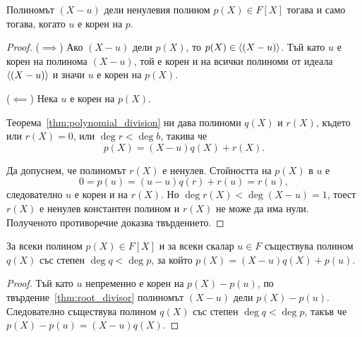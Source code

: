 \documentclass[numbers=endperiod, bibliography=totocnumbered]{scrartcl}
\begin{document}
\begin{proposition}\label{thm:root_divisor}
  Полиномът \( (X - u) \) дели ненулевия полином \( p(X) \in F[X] \) тогава и само тогава, когато \( u \) е корен на \( p \).
\end{proposition}
\begin{proof}
  (\( \implies \)) Ако \( (X - u) \) дели \( p(X) \), то \( p(X) \in \left\langle (X - u) \right\rangle \). Тъй като \( u \) е корен на полинома \( (X - u) \), той е корен и на всички полиноми от идеала \( \left\langle (X - u) \right\rangle \) и значи \( u \) е корен на \( p(X) \).

  (\( \impliedby \)) Нека \( u \) е корен на \( p(X) \).

  Теорема~\ref{thm:polynomial_division} ни дава полиноми \( q(X) \) и \( r(X) \), където или \( r(X) = 0 \), или \( \deg r < \deg b \), такива че
  \begin{equation*}
    p(X) = (X - u) q(X) + r(X).
  \end{equation*}

  Да допуснем, че полиномът \( r(X) \) е ненулев. Стойността на \( p(X) \) в \( u \) е
  \begin{equation*}
    0 = p(u) = (u - u) q(r) + r(u) = r(u),
  \end{equation*}
  следователно \( u \) е корен и на \( r(X) \). Но \( \deg r(X) < \deg (X - u) = 1 \), тоест \( r(X) \) е ненулев константен полином и \( r(X) \) не може да има нули. Полученото противоречие доказва твърдението.
\end{proof}

\begin{proposition}\label{thm:root_inexact_divisor}
  За всеки полином \( p(X) \in F[X] \) и за всеки скалар \( u \in F \) съществува полином \( q(X) \) със степен \( \deg q < \deg p \), за който \( p(X) = (X - u) q(X) + p(u) \).
\end{proposition}
\begin{proof}
  Тъй като \( u \) непременно е корен на \( p(X) - p(u) \), по твърдение~\ref{thm:root_divisor} полиномът \( (X - u) \) дели \( p(X) - p(u) \). Следователно съществува полином \( q(X) \) със степен \( \deg q < \deg p \), такъв че \( p(X) - p(u) = (X - u) q(X) \).
\end{proof}
\end{document}
